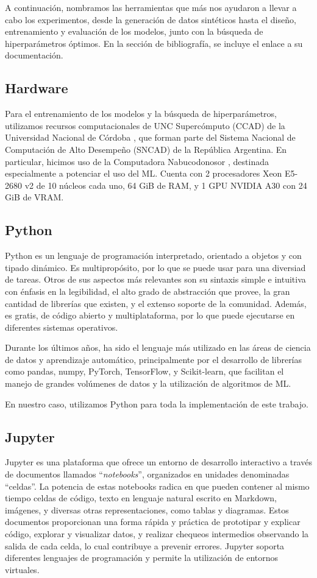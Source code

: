 \documentclass[../../main.tex]{subfiles}
\begin{document}
A continuación, nombramos las herramientas que más nos ayudaron a llevar a cabo los
experimentos, desde la generación de datos sintéticos hasta el diseño, entrenamiento y
evaluación de los modelos, junto con la búsqueda de hiperparámetros óptimos. En la
sección de bibliografía, se incluye el enlace a su documentación.

\subsection{Hardware}
Para el entrenamiento de los modelos y la búsqueda de hiperparámetros, utilizamos recursos
computacionales de UNC Supercómputo (CCAD) de la Universidad Nacional de Córdoba
\cite{ccad}, que forman parte del Sistema Nacional de Computación de Alto Desempeño
(SNCAD) de la República Argentina. En particular, hicimos uso de la Computadora
Nabucodonosor \cite{nabu}, destinada especialmente a potenciar el uso del ML. Cuenta con 2
procesadores Xeon E5-2680 v2 de 10 núcleos cada uno, 64 GiB de RAM, y 1 GPU NVIDIA A30 con
24 GiB de VRAM.

\subsection{Python}
Python \cite{python-docs} es un lenguaje de programación interpretado, orientado a objetos
y con tipado dinámico. Es multipropósito, por lo que se puede usar para una diversiad de
tareas. Otros de sus aspectos más relevantes son su sintaxis simple e intuitiva con
énfasis en la legibilidad, el alto grado de abstracción que provee, la gran cantidad de
librerías que existen, y el extenso soporte de la comunidad. Además, es gratis, de código
abierto y multiplataforma, por lo que puede ejecutarse en diferentes sistemas operativos.

Durante los últimos años, ha sido el lenguaje más utilizado en las áreas de ciencia
de datos y aprendizaje automático, principalmente por el desarrollo de librerías
como pandas, numpy, PyTorch, TensorFlow, y Scikit-learn, que facilitan el manejo
de grandes volúmenes de datos y la utilización de algoritmos de ML.

En nuestro caso, utilizamos Python para toda la implementación de este trabajo.

\subsection{Jupyter}
Jupyter \cite{jupyter-docs} es una plataforma que ofrece un entorno de desarrollo
interactivo a través de documentos llamados ``\textit{notebooks}'', organizados en
unidades denominadas ``celdas''. La potencia de estas notebooks radica en que pueden
contener al mismo tiempo celdas de código, texto en lenguaje natural escrito en Markdown,
imágenes, y diversas otras representaciones, como tablas y diagramas. Estos documentos
proporcionan una forma rápida y práctica de prototipar y explicar código, explorar y
visualizar datos, y realizar chequeos intermedios observando la salida de cada celda, lo
cual contribuye a prevenir errores. Jupyter soporta diferentes lenguajes de programación y
permite la utilización de entornos virtuales.
\end{document}
